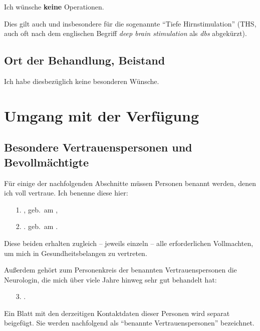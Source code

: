 \documentclass[pdftex,12pt,a4paper]{article}
\begin{document}
Ich wünsche \textbf{keine} Operationen.

Dies gilt auch und insbesondere für die sogenannte \enquote{Tiefe
Hirnstimulation} (THS, auch oft nach dem englischen Begriff 
\textit{deep brain stimulation} als \textit{dbs} abgekürzt).



\subsection{Ort der Behandlung, Beistand}

Ich habe diesbezüglich keine besonderen Wünsche.


\section{Umgang mit der Verfügung}

\subsection{Besondere Vertrauenspersonen und Bevollmächtigte}

Für einige der nachfolgenden Abschnitte müssen Personen benannt werden, 
denen ich voll vertraue. Ich benenne diese hier:

\begin{itemize}


\item[1.] \mytrustedone, geb.\ am \mytrustedonebirthday,

\item[2.] \mytrustedtwo. geb.\ am \mytrustedtwobirthday.


\end{itemize}

Diese beiden erhalten zugleich -- jeweils einzeln -- alle erforderlichen Vollmachten, um mich in Gesundheitsbelangen zu vertreten.

Außerdem gehört zum Personenkreis der benannten Vertrauenspersonen 
die Neurologin, die mich über viele Jahre hinweg sehr gut behandelt hat:


\begin{itemize}

\item[3.] \mytrustedthree.


\end{itemize}

Ein Blatt mit den derzeitigen Kontaktdaten dieser Personen wird
separat beigefügt. Sie werden nachfolgend als \enquote{benannte
Vertrauenspersonen} bezeichnet.
\end{document}
